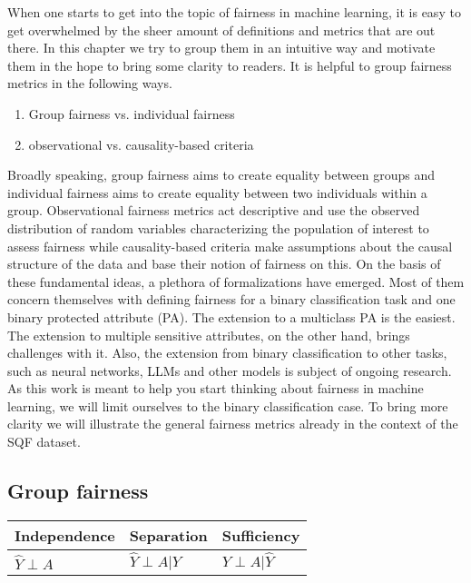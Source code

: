 When one starts to get into the topic of fairness in machine learning, it is easy to get overwhelmed by the sheer amount of definitions and metrics that are out there. In this chapter we try to group them in an intuitive way and motivate them in the hope to bring some clarity to readers. It is helpful to group fairness metrics in the following ways.
\begin{enumerate}
    \item Group fairness vs. individual fairness
    \item observational vs. causality-based criteria
\end{enumerate}

Broadly speaking, group fairness aims to create equality between groups and individual fairness aims to create equality between two individuals within a group. Observational fairness metrics act descriptive and use the observed distribution of random variables characterizing the population of interest to assess fairness while causality-based criteria make assumptions about the causal structure of the data and base their notion of fairness on this.
On the basis of these fundamental ideas, a plethora of formalizations have emerged. Most of them concern themselves with defining fairness for a binary classification task and one binary protected attribute (PA).
The extension to a multiclass PA is the easiest. The extension to multiple sensitive attributes, on the other hand, brings challenges with it. Also, the extension from binary classification to other tasks, such as neural networks, LLMs and other models is subject of ongoing research. As this work is meant to help you start thinking about fairness in machine learning, we will limit ourselves to the binary classification case.
To bring more clarity we will illustrate the general fairness metrics already in the context of the SQF dataset.

\subsection{Group fairness}
\begin{table}
    \begin{tabular}{lll}
        \toprule
        Independence & Separation & {Sufficiency} \\
        \midrule
        $\hat{Y} \perp A$ & $\hat{Y} \perp A | Y$ & {$Y \perp A | \hat{Y}$}\\
        \bottomrule
    \end{tabular}
\end{table}


